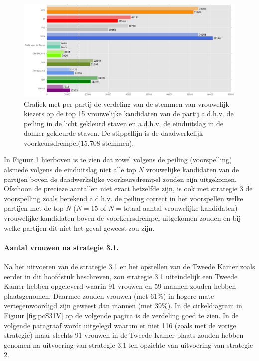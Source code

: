 \begin{figure}[H]

	\includegraphics[width=\linewidth]	{stemmen_op_vrouwen_top15_of_topN_samen.png}

			\caption{Grafiek met per partij de verdeling van de stemmen van vrouwelijk kiezers op de top 15 vrouwelijke kandidaten van de partij a.d.h.v. de peiling \citep{IPSOS} in de licht gekleurd staven en a.d.h.v. de einduitslag \citep{Kiesraad_databank} in de donker gekleurde staven. De stippellijn is de daadwerkelijk voorkeursdrempel(15.708 stemmen).} 

\label{fig:stemmenS31V}
\end{figure}

In Figuur \ref{fig:stemmenS31V} hierboven is te zien dat zowel volgens de peiling (voorspelling) alsmede volgens de einduitslag niet alle top \textit{N} vrouwelijke kandidaten van de partijen boven de daadwerkelijke voorkeursdrempel zouden zijn uitgekomen. Ofschoon de precieze aantallen niet exact hetzelfde zijn, is ook met strategie 3 de voorspelling zoals berekend a.d.h.v. de peiling correct in het voorspellen welke partijen met de top \textit{N} ($N=15$ of $N=$totaal aantal vrouwelijke kandidaten) vrouwelijke kandidaten boven de voorkeursdrempel uitgekomen zouden en bij welke partijen dit niet het geval geweest zou zijn.


\paragraph{Aantal vrouwen na strategie 3.1.}
Na het uitvoeren van de strategie 3.1 en het opstellen van de Tweede Kamer zoals eerder in dit hoofdstuk beschreven, zou strategie 3.1 uiteindelijk een Tweede Kamer hebben opgeleverd waarin 91 vrouwen en 59 mannen zouden hebben plaatsgenomen. Daarmee zouden vrouwen (met 61\%) in hogere mate vertegenwoordigd zijn geweest dan mannen (met 39\%). In de cirkeldiagram in Figuur \ref{fig:pcS31V} op de volgende pagina is de verdeling goed te zien. In de volgende paragraaf wordt uitgelegd waarom er niet 116 (zoals met de vorige strategie) maar slechts 91 vrouwen in de Tweede Kamer plaats zouden hebben genomen na uitvoering van strategie 3.1 ten opzichte van uitvoering van strategie 2.


